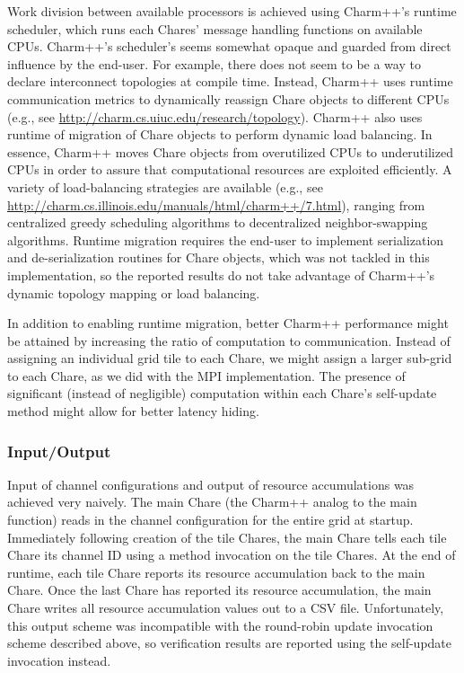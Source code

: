 Work division between available processors is achieved using Charm++'s runtime scheduler, which runs each Chares' message handling functions on available CPUs.
Charm++'s scheduler's seems somewhat opaque and guarded from direct influence by the end-user.
For example, there does not seem to be a way to declare interconnect topologies at compile time.
Instead, Charm++ uses runtime communication metrics to dynamically reassign Chare objects to different CPUs (e.g., see \url{http://charm.cs.uiuc.edu/research/topology}).
Charm++ also uses runtime of migration of Chare objects to perform dynamic load balancing.
In essence, Charm++ moves Chare objects from overutilized CPUs to underutilized CPUs in order to assure that computational resources are exploited efficiently.
A variety of load-balancing strategies are available (e.g., see \url{http://charm.cs.illinois.edu/manuals/html/charm++/7.html}), ranging from centralized greedy scheduling algorithms to decentralized neighbor-swapping algorithms.
Runtime migration requires the end-user to implement serialization and de-serialization routines for Chare objects, which was not tackled in this implementation, so the reported results do not take advantage of Charm++'s dynamic topology mapping or load balancing.

In addition to enabling runtime migration, better Charm++ performance might be attained by increasing the ratio of computation to communication.
Instead of assigning an individual grid tile to each Chare, we might assign a larger sub-grid to each Chare, as we did with the MPI implementation.
The presence of significant (instead of negligible) computation within each Chare's self-update method might allow for better latency hiding.

\subsubsection{Input/Output}

Input of channel configurations and output of resource accumulations was achieved very naively.
The main Chare (the Charm++ analog to the main function) reads in the channel configuration for the entire grid at startup.
Immediately following creation of the tile Chares, the main Chare tells each tile Chare its channel ID using a method invocation on the tile Chares.
At the end of runtime, each tile Chare reports its resource accumulation back to the main Chare.
Once the last Chare has reported its resource accumulation, the main Chare writes all resource accumulation values out to a CSV file.
Unfortunately, this output scheme was incompatible with the round-robin update invocation scheme described above, so verification results are reported using the self-update invocation instead.

